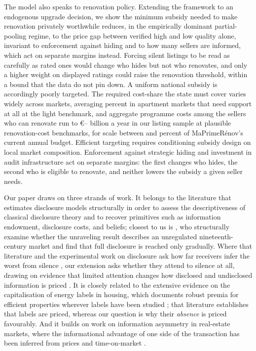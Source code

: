 The model also speaks to renovation policy. Extending the framework to an endogenous upgrade
decision, we show the minimum subsidy needed to make renovation privately worthwhile reduces, in
the empirically dominant partial-pooling regime, to the price gap between verified high and low
quality alone, invariant to enforcement against hiding and to how many sellers are informed,
which act on separate margins instead. Forcing silent listings to be read as carefully as rated ones would change who hides but not who renovates, and only a higher weight on displayed ratings could raise the renovation threshold, within a bound that the data do not pin down. %
A uniform national subsidy is accordingly poorly targeted. The
required cost-share the state must cover varies widely across
markets, averaging \attBaseCostShareTwoFiftyApt{} percent in apartment markets that need support at all at the light benchmark, and aggregate programme costs among the sellers who can renovate run to
\euro{}\attScCostBaseTotTwoFifty{}--\attScCostBaseTotFiveHundred{} billion a year in our listing sample at plausible renovation-cost benchmarks, for scale between \attScCostBaseTotTwoFiftyLo{} and
\attScCostBaseTotFiveHundredHi{} percent of MaPrimeR\'enov's current annual budget. Efficient targeting requires conditioning subsidy design
on local market composition. Enforcement against strategic hiding and investment in audit
infrastructure act on separate margins: the first changes who hides, the second who is eligible to renovate, and neither lowers the subsidy a given seller needs.

Our paper draws on three strands of work. It belongs to the literature that estimates
disclosure models structurally in order to assess the descriptiveness of classical disclosure
theory and to recover primitives such as information endowment, disclosure costs, and beliefs;
closest to us is \citet{bourveau_learning_2025}, who structurally examine whether the unraveling
result describes an unregulated nineteenth-century market and find that full disclosure is
reached only gradually. Where that literature and the experimental work on disclosure ask how far
receivers infer the worst from silence \citep{jin_is_2021, hagenbach_motivated_2025}, our extension
asks whether they attend to silence at all, drawing on evidence that limited attention changes how
disclosed and undisclosed information is priced \citep{hirshleifer_limited_2003, dellavigna_investor_2009}.
It is closely related to the extensive evidence on the capitalisation of energy labels in
housing, which documents robust premia for efficient properties wherever labels have been
studied \citep{brounen_kok_2011, hyland_lyons_2013, fuerst_energy_2016, frondel_power_2018,
myers_mandatory_2022}; that literature establishes that labels are priced, whereas our question
is why their \emph{absence} is priced favourably. And it builds on work on information
asymmetry in real-estate markets, where the informational advantage of one side of the
transaction has been inferred from prices and time-on-market \citep{levitt_syverson_2008,
lizzeri_1999}.

